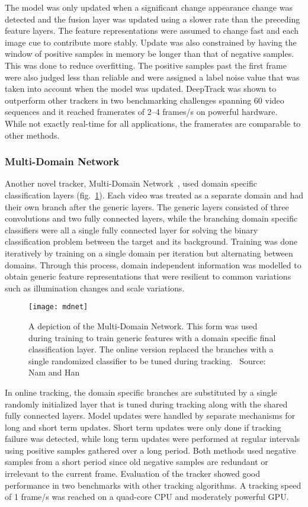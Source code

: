 The model was only updated when a significant change appearance change was detected
and the fusion layer was updated using a slower rate than the preceding feature layers.
The feature representations were assumed to change fast and each image cue to contribute
more stably. Update was also constrained by having the window of positive samples in
memory be longer than that of negative samples. This was done to reduce overfitting.
The positive samples past the first frame were also judged less than reliable and
were assigned a label noise value that was taken into account when the model was updated.
DeepTrack was shown to outperform other trackers in two benchmarking challenges
spanning 60 video sequences and it reached framerates of 2--4 frames/s on powerful
hardware.~\cite{DEEPTRACK} While not exactly real-time for all applications, the
framerates are comparable to other methods.

\subsubsection{Multi-Domain Network}
Another novel tracker, Multi-Domain Network~\cite{MDNET}, used domain specific
classification layers (fig.~\ref{fig:mdnet}). Each video was treated as a separate domain
and had their own branch after the generic layers. The generic layers consisted of three
convolutions and two fully connected layers, while the branching domain specific
classifiers were all a single fully connected layer for solving the binary classification
problem between the target and its background. Training was done iteratively by training
on a single domain per iteration but alternating between domains. Through this process,
domain independent information was modelled to obtain generic feature representations
that were resilient to common variations such as illumination changes and scale
variations.~\cite{MDNET}

\begin{figure}[H]
\centering
\texttt{[image: mdnet]}
\caption{A depiction of the Multi-Domain Network. This form was used during training
         to train generic features with a domain specific final classification layer.
         The online version replaced the branches with a single randomized classifier
         to be tuned during tracking.~\cite{MDNET} Source: Nam and Han~\cite{MDNET}}\label{fig:mdnet}
\end{figure}

In online tracking, the domain specific branches are substituted by a single randomly
initialized layer that is tuned during tracking along with the shared fully connected
layers. Model updates were handled by separate mechanisms for long and short term updates.
Short term updates were only done if tracking failure was detected, while long term updates
were performed at regular intervals using positive samples gathered over a long period.
Both methods used negative samples from a short period since old negative samples are
redundant or irrelevant to the current frame. Evaluation of the tracker showed good
performance in two benchmarks with other tracking algorithms. A tracking speed of
1 frame/s was reached on a quad-core CPU and moderately powerful GPU.~\cite{MDNET}

